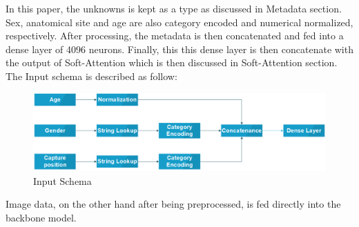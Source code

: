 \documentclass[sensors,article,submit,pdftex,moreauthors]{Definitions/mdpi}
\begin{document}
In this paper, the unknowns is kept as a type as discussed in Metadata section. Sex, anatomical site and age are also category encoded and numerical normalized, respectively. After processing, the metadata is then concatenated and fed into a dense layer of 4096 neurons. Finally, this this dense layer is then concatenate with the output of Soft-Attention which is then discussed in Soft-Attention section. The Input schema is described as follow:
\FloatBarrier
\begin{figure}[h]
	\centering
	\includegraphics[width=1\linewidth]{"Definitions/Input Schema"}
	\caption{Input Schema}
	\label{fig:input-schema}
\end{figure}
\FloatBarrier
Image data, on the other hand after being preprocessed, is fed directly into the backbone model. 
\end{document}
